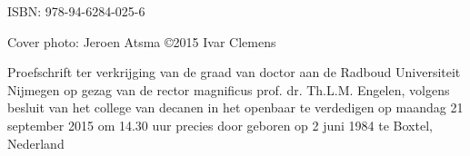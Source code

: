 \begin{titlepage}

\fontsize{12pt}{14pt}\selectfont

\qquad

\fontsize{17.28pt}{21pt}\selectfont

\noindent \concept{\thesistitle}
\fontsize{15.28pt}{20pt}\selectfont
 \npar \noindent \thesissubtitle

\fontsize{12pt}{14pt}\selectfont

\vspace{1cm}

\noindent {}

\vspace{3cm}

\end{titlepage}



\clearpage

\null
\vspace*{\fill}
\noindent ISBN: 978-94-6284-025-6

\npar
\noindent Cover photo: Jeroen Atsma
\npar
\noindent \copyright 2015 Ivar Clemens

\clearpage



\begin{center}

\fontsize{17.28pt}{21pt}\selectfont

{\textsc{\MakeUppercase{\thesistitle}}}
 \npar \MakeUppercase{\thesissubtitle}

\fontsize{12pt}{14pt}\selectfont

\vspace{1cm}
Proefschrift
\vspace{1cm}
\npar
ter verkrijging van de graad van doctor
\npar
aan de Radboud Universiteit Nijmegen
\npar
op gezag van de rector magnificus prof. dr. Th.L.M. Engelen,
\npar
volgens besluit van het college van decanen
\npar
in het openbaar te verdedigen op maandag 21 september 2015
\npar
om 14.30 uur precies
\npar
\vspace{1cm}
door
\npar
\vspace{1cm}
\npar
geboren op 2 juni 1984
\npar
te Boxtel, Nederland

\vspace{2.8cm}

\fontsize{17.28pt}{21pt}\selectfont
\end{center}


